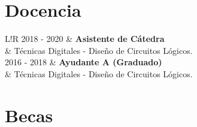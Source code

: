 \documentclass[10pt]{article}
\newcommand\VRule{\color{lightgray}\vrule width 0.5pt}
\begin{document}
\section{Docencia}
\begin{tabular}{L!{\VRule}R}
2018 - 2020 & {\bf Asistente de Cátedra} \\
	 & Técnicas Digitales - Diseño de Circuitos Lógicos. \\ [5pt]
	 
2016 - 2018 & {\bf Ayudante A (Graduado)} \\
	 & Técnicas Digitales - Diseño de Circuitos Lógicos. \\
\end{tabular}

\section{Becas}
\end{document}

